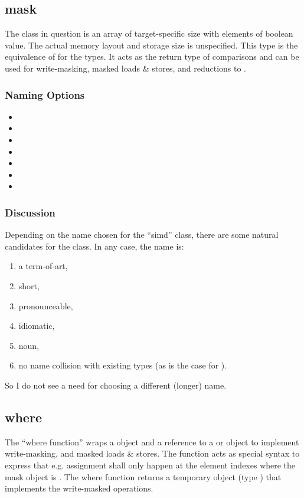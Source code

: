 \subsection{mask}

The class in question is an array of target-specific size with elements of boolean value.
The actual memory layout and storage size is unspecified.
This type is the equivalence of  for the  types.
It acts as the return type of  comparisons and can be used for write-masking, masked loads \& stores, and reductions to .

\subsubsection{Naming Options}

\begin{itemize}
  \item {}
  \item {}
  \item {}
  \item {}
  \item {}
  \item {}
  \item {}
\end{itemize}

\subsubsection{Discussion}

Depending on the name chosen for the “simd” class, there are some natural candidates for the  class.
In any case, the  name is:
\begin{enumerate}
  \item a term-of-art,
  \item short,
  \item pronounceable,
  \item idiomatic,
  \item noun,
  \item no name collision with existing types (as is the case for ).
\end{enumerate}
So I do not see a need for choosing a different (longer) name.

\subsection{where}
The “where function” wraps a  object and a reference to a  or  object to implement write-masking, and masked loads \& stores.
The function acts as special syntax to express that e.g. assignment shall only happen at the element indexes where the mask object is .
The where function returns a temporary object (type ) that implements the write-masked operations.

